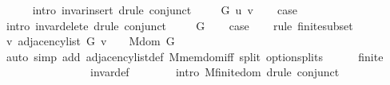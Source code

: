 \begin{isabellebody}
\ \ \ \ \isamarkupfalse%
\ {\isacharparenleft}{\kern0pt}intro\ invar{\isacharunderscore}{\kern0pt}insert{\isacharprime}{\kern0pt}{\isacharparenright}{\kern0pt}\ {\isacharparenleft}{\kern0pt}drule\ conjunct{}{\isacharparenright}{\kern0pt}\isanewline
{}\isamarkupfalse%
\isanewline
\ \ \isamarkupfalse%
\ {\isacharparenleft}{\kern0pt}{}\ G\ u\ v{\isacharparenright}{\kern0pt}\isanewline
\ \ \isamarkupfalse%
\ {\isacharquery}{\kern0pt}case\isanewline
\ \ \ \ \isamarkupfalse%
\ {\isacharparenleft}{\kern0pt}intro\ invar{\isacharunderscore}{\kern0pt}delete{\isacharprime}{\kern0pt}{\isacharparenright}{\kern0pt}\ {\isacharparenleft}{\kern0pt}drule\ conjunct{}{\isacharparenright}{\kern0pt}\isanewline
{}\isamarkupfalse%
\isanewline
\ \ \isamarkupfalse%
\ {\isacharparenleft}{\kern0pt}{}\ G{\isacharparenright}{\kern0pt}\isanewline
\ \ \isamarkupfalse%
\ {\isacharquery}{\kern0pt}case\isanewline
\ \ \isamarkupfalse%
\ {\isacharparenleft}{\kern0pt}rule\ finite{\isacharunderscore}{\kern0pt}subset{\isacharparenright}{\kern0pt}\isanewline
\ \ \ \ \isamarkupfalse%
\ {\isachardoublequoteopen}{\isacharbraceleft}{\kern0pt}v{\isachardot}{\kern0pt}\ adjacency{\isacharunderscore}{\kern0pt}list\ G\ v\ {\isasymnoteq}\ {\isacharbrackleft}{\kern0pt}{\isacharbrackright}{\kern0pt}{\isacharbraceright}{\kern0pt}\ {\isasymsubseteq}\ M{\isachardot}{\kern0pt}dom\ G{\isachardoublequoteclose}\isanewline
\ \ \ \ \ \ \isamarkupfalse%
\ {\isacharparenleft}{\kern0pt}auto\ simp\ add{\isacharcolon}{\kern0pt}\ adjacency{\isacharunderscore}{\kern0pt}list{\isacharunderscore}{\kern0pt}def\ M{\isachardot}{\kern0pt}mem{\isacharunderscore}{\kern0pt}dom{\isacharunderscore}{\kern0pt}iff\ split{\isacharcolon}{\kern0pt}\ option{\isachardot}{\kern0pt}splits{\isacharparenright}{\kern0pt}\isanewline
\ \ \ \ \isamarkupfalse%
\ {\isachardoublequoteopen}finite\ {\isachardot}{\kern0pt}{\isachardot}{\kern0pt}{\isachardot}{\kern0pt}{\isachardoublequoteclose}\isanewline
\ \ \ \ \ \ \isamarkupfalse%
\ {}\isanewline
\ \ \ \ \ \ \isamarkupfalse%
\ invar{\isacharunderscore}{\kern0pt}def\isanewline
\ \ \ \ \ \ \isamarkupfalse%
\ {\isacharparenleft}{\kern0pt}intro\ M{\isachardot}{\kern0pt}finite{\isacharunderscore}{\kern0pt}dom{\isacharparenright}{\kern0pt}\ {\isacharparenleft}{\kern0pt}drule\ conjunct{}{\isacharparenright}{\kern0pt}\isanewline

\end{isabellebody}

